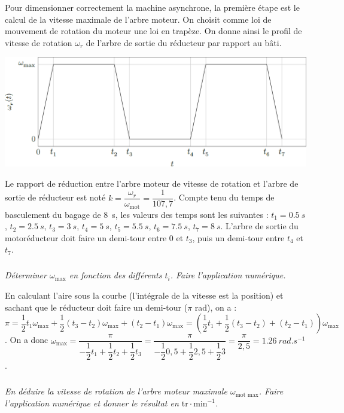 \documentclass[10pt,fleqn]{article} %
\begin{document}
\begin{multicols}{2}
\begin{multicols}{2}
\ifprof
\else
Pour dimensionner correctement la machine asynchrone, la première étape est le calcul de la vitesse maximale
de l’arbre moteur.
On choisit comme loi de mouvement de rotation du moteur une loi en trapèze. On donne ainsi le profil de vitesse de rotation $\omega_r$ de l’arbre de sortie du réducteur par rapport au bâti.

\begin{center}
\includegraphics[width=\linewidth]{images/fig_02}
\end{center}

Le rapport de réduction entre l’arbre moteur de vitesse de rotation et l’arbre de sortie de réducteur est noté $k=\dfrac{\omega_r}{\omega_{\text{mot}}} = \dfrac{1}{107,7}$.
Compte tenu du temps de basculement du bagage de \SI{8}{s}, les valeurs des temps sont les suivantes : $t_1=\SI{0,5}{s}$, $t_2=\SI{2,5}{s}$, $t_3=\SI{3}{s}$, $t_4=\SI{5}{s}$, $t_5=\SI{5,5}{s}$, $t_6=\SI{7,5}{s}$, $t_7=\SI{8}{s}$. L’arbre de sortie du motoréducteur doit faire un demi-tour entre 0 et $t_3$, puis un demi-tour entre $t_4$ et $t_7$.

\fi

\subparagraph{}\textit{Déterminer $\omega_{\text{max}}$ en fonction des différents 
$t_i$. Faire l’application numérique.}
\ifprof
\begin{corrige}
En calculant l'aire sous la courbe (l'intégrale de la vitesse est la position) et sachant que le réducteur doit faire un demi-tour ($\pi$ rad), on a : 
$\pi = \dfrac{1}{2}t_1 \omega_{\text{max}} +\dfrac{1}{2}\left( t_3 - t_2\right) \omega_{\text{max}} + \left( t_2 - t_1\right)\omega_{\text{max}}= \left(\dfrac{1}{2}t_1  +\dfrac{1}{2}\left( t_3 - t_2\right)  + \left( t_2 - t_1\right)\right)\omega_{\text{max}} $.  On a donc $\omega_{\text{max}}  = \dfrac{\pi}{ -\dfrac{1}{2}t_1 +\dfrac{1}{2}t_2 +  \dfrac{1}{2}t_3  }=\dfrac{\pi}{ -\dfrac{1}{2}0,5 +\dfrac{1}{2}2,5  +\dfrac{1}{2} 3 }=\dfrac{\pi}{2,5}=\SI{1,26}{rad.s^{-1}}$.
\end{corrige}
\else
\fi


\subparagraph{}\textit{En déduire la vitesse de rotation de l’arbre moteur maximale $\omega_{\text{mot max}}$. Faire l’application numérique et donner le résultat en $\text{tr}\cdot\text{min}^{-1}$.}


\end{multicols}
\end{multicols}
\end{document}
